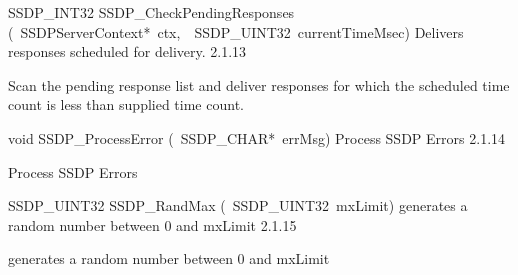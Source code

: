 \documentclass{article}
\begin{document}
\begin{cxxentry}
\begin{cxxentry}
\begin{cxxfunction}
\begin{cxxdoc}
\end{cxxdoc}
\end{cxxfunction}
\begin{cxxfunction}
{SSDP\_INT32}
        {SSDP\_CheckPendingResponses}
        {(\ SSDPServerContext*\ ctx,\ \ SSDP\_UINT32\ currentTimeMsec)}
        {Delivers responses scheduled for delivery. }
        {2.1.13}
\begin{cxxdoc}
Scan the pending response list and deliver responses for which the
scheduled time count is less than supplied time count.


\end{cxxdoc}
\end{cxxfunction}
\begin{cxxfunction}
{void}
        {SSDP\_ProcessError}
        {(\ SSDP\_CHAR*\ errMsg)}
        {Process SSDP Errors}
        {2.1.14}
\begin{cxxdoc}
Process SSDP Errors


\end{cxxdoc}
\end{cxxfunction}
\begin{cxxfunction}
{SSDP\_UINT32}
        {SSDP\_RandMax}
        {(\ SSDP\_UINT32\ mxLimit)}
        {generates a random number between 0 and mxLimit}
        {2.1.15}
\begin{cxxdoc}
generates a random number between 0 and mxLimit



\end{cxxdoc}
\end{cxxfunction}
\end{cxxentry}
\end{cxxentry}
\end{document}
